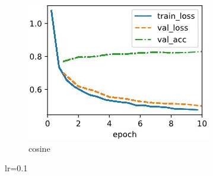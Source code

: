 \documentclass{article}
\begin{document}
\begin{figure}
\begin{subfigure}[b]{0.3\columnwidth}
      \includegraphics[width=\columnwidth]{img/lr0.1 cosine.jpg}
      \caption{cosine}
   \end{subfigure}
   \caption{lr=0.1}
      \label{lr:0.1}
\end{figure}
\end{document}
